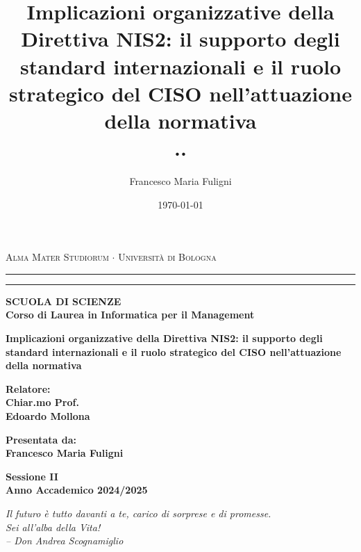 \documentclass[12pt,a4paper,twoside,openright]{report}
\title{\textbf{Implicazioni organizzative della Direttiva NIS2: il supporto degli standard internazionali e il ruolo strategico del CISO nell'attuazione della normativa} \\
    \large ..}
\author{Francesco Maria Fuligni}
\date{\today}
\begin{document}
\begin{titlepage}
  \begin{center}
    {{\Large{\textsc{Alma Mater Studiorum $\cdot$ Universit\`a di Bologna}}}} \rule[0.1cm]{15.8cm}{0.1mm}
    \rule[0.5cm]{15.8cm}{0.6mm}
    {\small{\bf SCUOLA DI SCIENZE\\
    Corso di Laurea in Informatica per il Management }}
  \end{center}
  \vspace{15mm}
  \begin{center}
    {\LARGE{\bf Implicazioni organizzative della Direttiva NIS2: il supporto degli standard internazionali e il ruolo strategico del CISO nell'attuazione della normativa }}\\
    \vspace{3mm}
  \end{center}
  \vspace{40mm}
  \par
  \noindent
  \begin{minipage}[t]{0.47\textwidth}
    {\large{\bf Relatore:\\
    Chiar.mo Prof.\\
    Edoardo Mollona
    }}
  \end{minipage}
  \hfill
  \begin{minipage}[t]{0.47\textwidth}\raggedleft
    {\large{\bf Presentata da:\\
    Francesco Maria Fuligni
    }}\\
  \end{minipage}
  \vspace{20mm}
  \begin{center}
    {\large{\bf Sessione II\\
    Anno Accademico 2024/2025}}
  \end{center}
\end{titlepage}



\cleardoublepage
\thispagestyle{empty}
\vspace*{7cm}
\begin{flushright}
\large
\textit{Il futuro è tutto davanti a te, carico di sorprese e di promesse.\\
Sei all’alba della Vita!\\
\small{-- Don Andrea Scognamiglio}}
\end{flushright}
\end{document}
